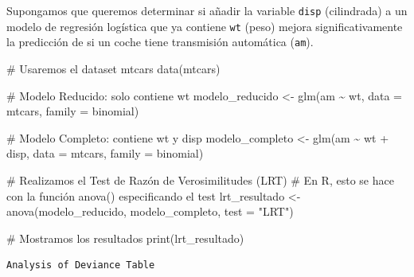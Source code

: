 \documentclass[
  letterpaper,
  DIV=11,
  numbers=noendperiod]{scrreprt}
\newenvironment{Shaded}{\begin{snugshade}}{\end{snugshade}}
\newcommand{\AttributeTok}[1]{\textcolor[rgb]{0.40,0.45,0.13}{#1}}
\newcommand{\CommentTok}[1]{\textcolor[rgb]{0.37,0.37,0.37}{#1}}
\newcommand{\FunctionTok}[1]{\textcolor[rgb]{0.28,0.35,0.67}{#1}}
\newcommand{\NormalTok}[1]{\textcolor[rgb]{0.00,0.23,0.31}{#1}}
\newcommand{\OtherTok}[1]{\textcolor[rgb]{0.00,0.23,0.31}{#1}}
\newcommand{\SpecialCharTok}[1]{\textcolor[rgb]{0.37,0.37,0.37}{#1}}
\newcommand{\StringTok}[1]{\textcolor[rgb]{0.13,0.47,0.30}{#1}}
\begin{document}
\begin{tcolorbox}[enhanced jigsaw, breakable, toprule=.15mm, bottomtitle=1mm, coltitle=black, colbacktitle=quarto-callout-tip-color!10!white, titlerule=0mm, opacitybacktitle=0.6, bottomrule=.15mm, toptitle=1mm, title=\textcolor{quarto-callout-tip-color}{\faLightbulb}\hspace{0.5em}{Ejemplo: Comparando Modelos con el Test de Razón de Verosimilitudes}, arc=.35mm, rightrule=.15mm, opacityback=0, colframe=quarto-callout-tip-color-frame, leftrule=.75mm, left=2mm, colback=white]

Supongamos que queremos determinar si añadir la variable \texttt{disp}
(cilindrada) a un modelo de regresión logística que ya contiene
\texttt{wt} (peso) mejora significativamente la predicción de si un
coche tiene transmisión automática (\texttt{am}).

\begin{Shaded}
\begin{Highlighting}[]
\CommentTok{\# Usaremos el dataset mtcars}
\FunctionTok{data}\NormalTok{(mtcars)}

\CommentTok{\# Modelo Reducido: solo contiene \textquotesingle{}wt\textquotesingle{}}
\NormalTok{modelo\_reducido }\OtherTok{\textless{}{-}} \FunctionTok{glm}\NormalTok{(am }\SpecialCharTok{\textasciitilde{}}\NormalTok{ wt, }\AttributeTok{data =}\NormalTok{ mtcars, }\AttributeTok{family =}\NormalTok{ binomial)}

\CommentTok{\# Modelo Completo: contiene \textquotesingle{}wt\textquotesingle{} y \textquotesingle{}disp\textquotesingle{}}
\NormalTok{modelo\_completo }\OtherTok{\textless{}{-}} \FunctionTok{glm}\NormalTok{(am }\SpecialCharTok{\textasciitilde{}}\NormalTok{ wt }\SpecialCharTok{+}\NormalTok{ disp, }\AttributeTok{data =}\NormalTok{ mtcars, }\AttributeTok{family =}\NormalTok{ binomial)}

\CommentTok{\# Realizamos el Test de Razón de Verosimilitudes (LRT)}
\CommentTok{\# En R, esto se hace con la función anova() especificando el test}
\NormalTok{lrt\_resultado }\OtherTok{\textless{}{-}} \FunctionTok{anova}\NormalTok{(modelo\_reducido, modelo\_completo, }\AttributeTok{test =} \StringTok{"LRT"}\NormalTok{)}

\CommentTok{\# Mostramos los resultados}
\FunctionTok{print}\NormalTok{(lrt\_resultado)}
\end{Highlighting}
\end{Shaded}

\begin{verbatim}
Analysis of Deviance Table


\end{verbatim}
\end{tcolorbox}
\end{document}
